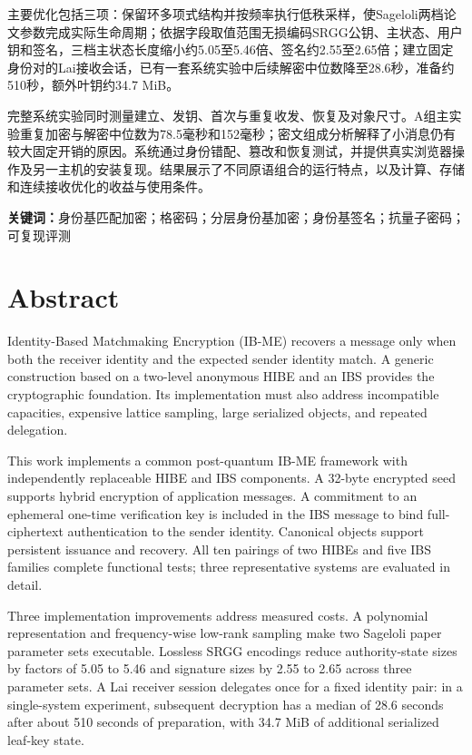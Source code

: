 \documentclass[UTF8,a4paper,12pt,oneside,openany,fontset=fandol]{ctexrep}
\begin{document}
主要优化包括三项：保留环多项式结构并按频率执行低秩采样，使Sageloli两档论文参数完成实际生命周期；依据字段取值范围无损编码SRGG公钥、主状态、用户钥和签名，三档主状态长度缩小约5.05至5.46倍、签名约2.55至2.65倍；建立固定身份对的Lai接收会话，已有一套系统实验中后续解密中位数降至28.6秒，准备约510秒，额外叶钥约34.7 MiB。

完整系统实验同时测量建立、发钥、首次与重复收发、恢复及对象尺寸。A组主实验重复加密与解密中位数为78.5毫秒和152毫秒；密文组成分析解释了小消息仍有较大固定开销的原因。系统通过身份错配、篡改和恢复测试，并提供真实浏览器操作及另一主机的安装复现。结果展示了不同原语组合的运行特点，以及计算、存储和连续接收优化的收益与使用条件。

\noindent\textbf{关键词：}身份基匹配加密；格密码；分层身份基加密；身份基签名；抗量子密码；可复现评测

\clearpage
\chapter*{Abstract}
\begingroup
\linespread{1.15}\selectfont
Identity-Based Matchmaking Encryption (IB-ME) recovers a message only when both the receiver identity and the expected sender identity match. A generic construction based on a two-level anonymous HIBE and an IBS provides the cryptographic foundation. Its implementation must also address incompatible capacities, expensive lattice sampling, large serialized objects, and repeated delegation.

This work implements a common post-quantum IB-ME framework with independently replaceable HIBE and IBS components. A 32-byte encrypted seed supports hybrid encryption of application messages. A commitment to an ephemeral one-time verification key is included in the IBS message to bind full-ciphertext authentication to the sender identity. Canonical objects support persistent issuance and recovery. All ten pairings of two HIBEs and five IBS families complete functional tests; three representative systems are evaluated in detail.

Three implementation improvements address measured costs. A polynomial representation and frequency-wise low-rank sampling make two Sageloli paper parameter sets executable. Lossless SRGG encodings reduce authority-state sizes by factors of 5.05 to 5.46 and signature sizes by 2.55 to 2.65 across three parameter sets. A Lai receiver session delegates once for a fixed identity pair: in a single-system experiment, subsequent decryption has a median of 28.6 seconds after about 510 seconds of preparation, with 34.7 MiB of additional serialized leaf-key state.
\end{document}
